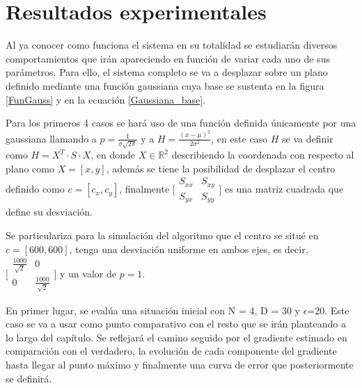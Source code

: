 \newpage
\thispagestyle{empty}
\mbox{}

\chapter{Resultados experimentales}
\label{ch:chapter3}

Al ya conocer como funciona el sistema en su totalidad se estudiarán diversos comportamientos que irán apareciendo en función de variar cada uno de sus parámetros. Para ello, el sistema completo se va a desplazar sobre un plano definido mediante una función gaussiana cuya base se sustenta en la figura \ref{FunGauss} y en la ecuación \ref{Gaussiana_base}. 

Para los primeros 4 casos se hará uso de una función definida únicamente por una gaussiana llamando a $p=\frac{1}{\sigma\sqrt{2\pi}}$ y a $H = \frac{\left(x-\mu\right)^2}{2\sigma^2}$, en este caso $H$ se va definir como $H=X^{T}\cdot{S}\cdot{X}$, en donde $X\in\mathbb{R}^{2}$ describiendo la coordenada con respecto al plano como $X = [x,y]$, además se tiene la posibilidad de desplazar el centro definido como $c=[c_x,c_y]$, finalmente $\bigl[\begin{smallmatrix}S_{xx} & S_{xy}\\ S_{yx} & S_{yy}\end{smallmatrix}\bigr]$ es una matriz cuadrada que define su desviación.

Se particulariza para la simulación del algoritmo que el centro se situé en $c=[600,600]$, tenga una desviación uniforme en ambos ejes, es decir, $\bigl[\begin{smallmatrix}\frac{1000}{\sqrt{2}} & 0\\ 0 & \frac{1000}{\sqrt{2}}\end{smallmatrix}\bigr]$ y un valor de $p = 1$.

En primer lugar, se evalúa una situación inicial con N = 4, D = 30 y $\epsilon$=20. Este caso se va a usar como punto comparativo con el resto que se irán planteando a lo largo del capítulo. Se reflejará el camino seguido por el gradiente estimado en comparación con el verdadero, la evolución de cada componente del gradiente hasta llegar al punto máximo y finalmente una curva de error que posteriormente se definirá.

